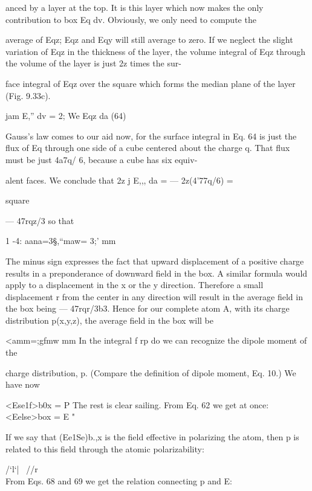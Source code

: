 {{ 

anced by a layer at the top. It is this layer which now makes the only
contribution to box Eq dv. Obviously, we only need to compute the

average of Eqz; Eqz and Eqy will still average to zero. If we neglect the
slight variation of Eqz in the thickness of the layer, the volume integral
of Eqz through the volume of the layer is just 2z times the sur-

face integral of Eqz over the square which forms the median plane
of the layer (Fig. 9.33c).

\begin{equation}
\end{equation}
jam E,'' dv = 2; We Eqz da (64)

Gauss's law comes to our aid now, for the surface integral in Eq. 64
is just the flux of Eq through one side of a cube centered about the
charge q. That flux must be just 4a7q/ 6, because a cube has six equiv-

alent faces. We conclude that 2z j E,,, da =  --- 2z(4'77q/6) =

square

 ---  47rqz/3 so that

1 -4:
aana=3§,``maw= 3;' mm

The minus sign expresses the fact that upward displacement of a
positive charge results in a preponderance of downward field in the
box. A similar formula would apply to a displacement in the x or
the y direction. Therefore a small displacement r from the center in
any direction will result in the average field in the box being
 --- 47rqr/3b3. Hence for our complete atom A, with its charge distribution
p(x,y,z), the average field in the box will be

<amm=;gfmw mm
In the integral f rp do we can recognize the dipole moment of the

charge distribution, p. (Compare the definition of dipole moment,
Eq. 10.) We have now

<Ese1f>b0x =  P 
The rest is clear sailing. From Eq. 62 we get at once:
<Eelse>box = E "  

If we say that (Ee1Se)b.,x is the field effective in polarizing the atom,
then p is related to this field through the atomic polarizability:

/‘l‘| \ //r\\

From Eqs. 68 and 69 we get the relation connecting p and E:

}}
